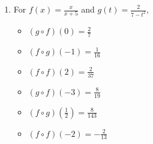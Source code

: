 \documentclass{ximera}
\begin{document}
\begin{enumerate}
\begin{multicols}{3}
\begin{itemize}
\item  $(f\circ g)(-1) = 1$

\item  $(f \circ f)(2) = \frac{3}{4}$

\end{itemize}

\end{multicols}

\begin{multicols}{3}

\begin{itemize}

\item  $(g\circ f)(-3) = \frac{48}{25}$

\item  $(f\circ g)\left(\frac{1}{2}\right) = -5$

\item  $(f \circ f)(-2)$ is undefined

\end{itemize}

\end{multicols}

\item  For  $f(x) = \frac{x}{x+5}$ and $g(t) = \frac{2}{7-t^2}$,
\begin{multicols}{3}

\begin{itemize}

\item  $(g\circ f)(0) = \frac{2}{7}$

\item  $(f\circ g)(-1) = \frac{1}{16}$

\item  $(f \circ f)(2) = \frac{2}{37}$

\end{itemize}

\end{multicols}

\begin{multicols}{3}

\begin{itemize}

\item  $(g\circ f)(-3) = \frac{8}{19}$

\item  $(f\circ g)\left(\frac{1}{2}\right) = \frac{8}{143}$

\item  $(f \circ f)(-2) = -\frac{2}{13}$


\end{itemize}
\end{multicols}
\end{enumerate}
\end{document}
